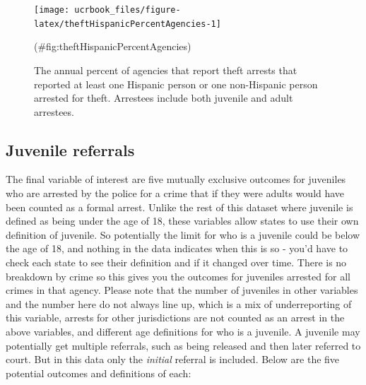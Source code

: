 \documentclass[
  12pt,
  openany]{book}
\begin{document}
\begin{figure}

{\centering \texttt{[image: ucrbook\_files/figure-latex/theftHispanicPercentAgencies-1]} 

}

\caption{The annual percent of agencies that report theft arrests that reported at least one Hispanic person or one non-Hispanic person arrested for theft. Arrestees include both juvenile and adult arrestees.}(\#fig:theftHispanicPercentAgencies)
\end{figure}

\hypertarget{juvenile-referrals}{%
\subsection{Juvenile referrals}\label{juvenile-referrals}}

The final variable of interest are five mutually exclusive outcomes for juveniles who are arrested by the police for a crime that if they were adults would have been counted as a formal arrest. Unlike the rest of this dataset where juvenile is defined as being under the age of 18, these variables allow states to use their own definition of juvenile. So potentially the limit for who is a juvenile could be below the age of 18, and nothing in the data indicates when this is so - you'd have to check each state to see their definition and if it changed over time. There is no breakdown by crime so this gives you the outcomes for juveniles arrested for all crimes in that agency. Please note that the number of juveniles in other variables and the number here do not always line up, which is a mix of underreporting of this variable, arrests for other jurisdictions are not counted as an arrest in the above variables, and different age definitions for who is a juvenile. A juvenile may potentially get multiple referrals, such as being released and then later referred to court. But in this data only the \emph{initial} referral is included. Below are the five potential outcomes and definitions of each:
\end{document}
